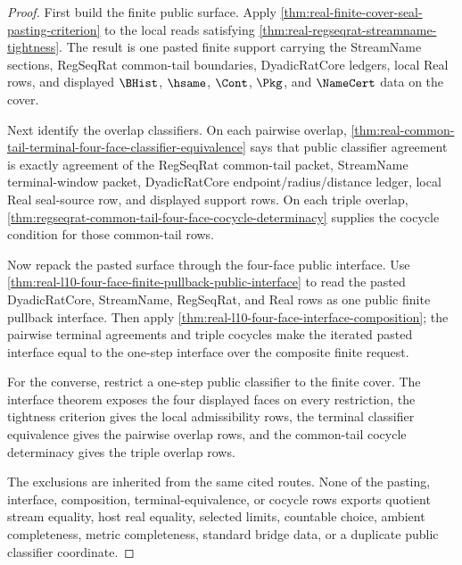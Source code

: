 \begin{proof}
First build the finite public surface. Apply \autoref{thm:real-finite-cover-seal-pasting-criterion} to the local reads satisfying \autoref{thm:real-regseqrat-streamname-tightness}. The result is one pasted finite support carrying the StreamName sections, RegSeqRat common-tail boundaries, DyadicRatCore ledgers, local Real rows, and displayed $\BHist$, $\hsame$, $\Cont$, $\Pkg$, and $\NameCert$ data on the cover.

Next identify the overlap classifiers. On each pairwise overlap, \autoref{thm:real-common-tail-terminal-four-face-classifier-equivalence} says that public classifier agreement is exactly agreement of the RegSeqRat common-tail packet, StreamName terminal-window packet, DyadicRatCore endpoint/radius/distance ledger, local Real seal-source row, and displayed support rows. On each triple overlap, \autoref{thm:regseqrat-common-tail-four-face-cocycle-determinacy} supplies the cocycle condition for those common-tail rows.

Now repack the pasted surface through the four-face public interface. Use \autoref{thm:real-l10-four-face-finite-pullback-public-interface} to read the pasted DyadicRatCore, StreamName, RegSeqRat, and Real rows as one public finite pullback interface. Then apply \autoref{thm:real-l10-four-face-interface-composition}; the pairwise terminal agreements and triple cocycles make the iterated pasted interface equal to the one-step interface over the composite finite request.

For the converse, restrict a one-step public classifier to the finite cover. The interface theorem exposes the four displayed faces on every restriction, the tightness criterion gives the local admissibility rows, the terminal classifier equivalence gives the pairwise overlap rows, and the common-tail cocycle determinacy gives the triple overlap rows.

The exclusions are inherited from the same cited routes. None of the pasting, interface, composition, terminal-equivalence, or cocycle rows exports quotient stream equality, host real equality, selected limits, countable choice, ambient completeness, metric completeness, standard bridge data, or a duplicate public classifier coordinate.
\end{proof}

